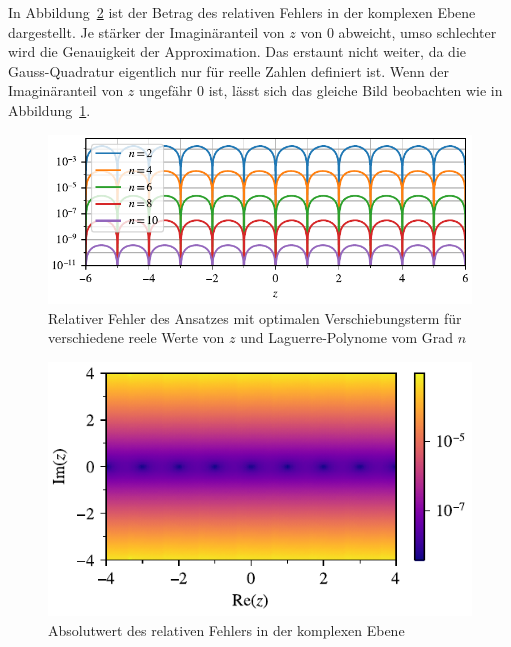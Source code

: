 In Abbildung~\ref{laguerre:fig:rel_error_complex}
ist der Betrag des relativen Fehlers in der komplexen Ebene dargestellt.
Je stärker der Imaginäranteil von $z$ von $0$ abweicht,
umso schlechter wird die Genauigkeit der Approximation.
Das erstaunt nicht weiter,
da die Gauss-Quadratur eigentlich nur für reelle Zahlen definiert ist.
Wenn der Imaginäranteil von $z$ ungefähr $0$ ist,
lässt sich das gleiche Bild beobachten wie in
Abbildung~\ref{laguerre:fig:rel_error_range}.

\begin{figure}
\centering
% 
\includegraphics{papers/laguerre/images/rel_error_range.pdf}
\caption{Relativer Fehler des Ansatzes mit optimalen Verschiebungsterm
für verschiedene reele Werte von $z$ und Laguerre-Polynome vom Grad $n$}
\label{laguerre:fig:rel_error_range}
\end{figure}

\begin{figure}
\centering
\includegraphics{papers/laguerre/images/rel_error_complex.pdf}
\caption{Absolutwert des relativen Fehlers in der komplexen Ebene}
\label{laguerre:fig:rel_error_complex}
\end{figure}

